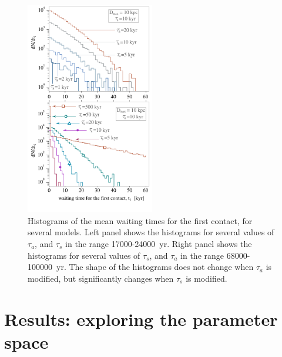 \documentclass[crop]{CSLB}
\begin{document}
\begin{figure}
   \centering
   \includegraphics[width=0.5\textwidth]{F_waiting_for_1C.pdf}
   \caption{
Histograms of the mean waiting times for the first contact, for
several models.
%
Left panel shows the histograms for several values of $\tau_a$, and
$\tau_s$ in the range 17000-24000~yr.
%
Right panel shows the histograms for several values of $\tau_s$, and
$\tau_a$ in the range 68000-100000~yr.
%
The shape of the histograms does not change when $\tau_a$ is
modified, but significantly changes when $\tau_s$ is modified. 
%
   }
   \label{F_waiting_for_1C}
\end{figure}



\section{Results: exploring the parameter space}\label{S_results}
\end{document}
